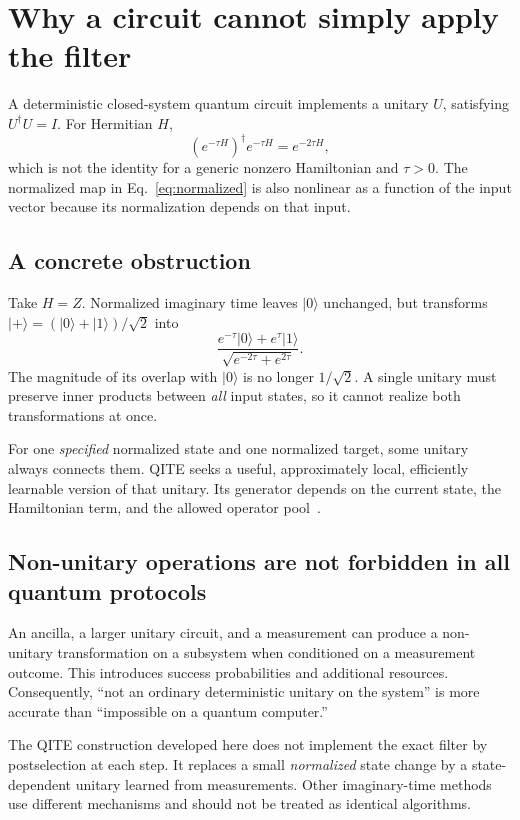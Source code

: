 \documentclass[11pt,a4paper]{article}
\newcommand{\ket}[1]{\lvert #1\rangle}
\newcommand{\lesson}[2]{\clearpage\section{#1}\label{#2}}
\begin{document}
\lesson{Why a circuit cannot simply apply the filter}{sec:nonunitary}
A deterministic closed-system quantum circuit implements a unitary $U$, satisfying $U^\dagger U=I$. For Hermitian $H$,
\[
(e^{-\tau H})^\dagger e^{-\tau H}=e^{-2\tau H},
\]
which is not the identity for a generic nonzero Hamiltonian and $\tau>0$. The normalized map in Eq.~\eqref{eq:normalized} is also nonlinear as a function of the input vector because its normalization depends on that input.

\subsection*{A concrete obstruction}
Take $H=Z$. Normalized imaginary time leaves $\ket{0}$ unchanged, but transforms $\ket{+}=(\ket{0}+\ket{1})/\sqrt2$ into
\[
\frac{e^{-\tau}\ket{0}+e^{\tau}\ket{1}}
{\sqrt{e^{-2\tau}+e^{2\tau}}}.
\]
The magnitude of its overlap with $\ket{0}$ is no longer $1/\sqrt2$. A single unitary must preserve inner products between \emph{all} input states, so it cannot realize both transformations at once.

\begin{idea}
For one \emph{specified} normalized state and one normalized target, some unitary always connects them. QITE seeks a useful, approximately local, efficiently learnable version of that unitary. Its generator depends on the current state, the Hamiltonian term, and the allowed operator pool~\cite{motta}.
\end{idea}

\subsection*{Non-unitary operations are not forbidden in all quantum protocols}
An ancilla, a larger unitary circuit, and a measurement can produce a non-unitary transformation on a subsystem when conditioned on a measurement outcome. This introduces success probabilities and additional resources. Consequently, ``not an ordinary deterministic unitary on the system'' is more accurate than ``impossible on a quantum computer.''

The QITE construction developed here does not implement the exact filter by postselection at each step. It replaces a small \emph{normalized} state change by a state-dependent unitary learned from measurements. Other imaginary-time methods use different mechanisms and should not be treated as identical algorithms.
\end{document}
